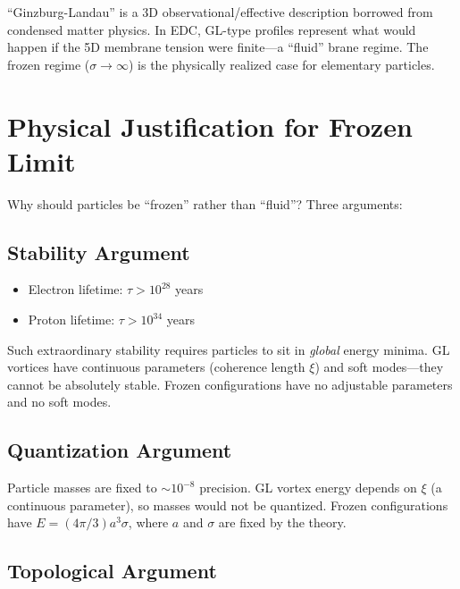 \begin{tcolorbox}[colback=cyan!5!white, colframe=cyan!50!black,
    title=\textbf{Framework 2.0 Clarification}]
``Ginzburg-Landau'' is a 3D observational/effective description borrowed from condensed
matter physics. In EDC, GL-type profiles represent what would happen if the 5D membrane
tension were finite---a ``fluid'' brane regime. The frozen regime ($\sigma \to \infty$)
is the physically realized case for elementary particles.
\end{tcolorbox}


\section{Physical Justification for Frozen Limit}
\label{sec:ch2_frozen_justification}

Why should particles be ``frozen'' rather than ``fluid''? Three arguments:

\subsection{Stability Argument}

\begin{itemize}
    \item Electron lifetime: $\tau > 10^{28}$ years
    \item Proton lifetime: $\tau > 10^{34}$ years
\end{itemize}

Such extraordinary stability requires particles to sit in \emph{global} energy minima.
GL vortices have continuous parameters (coherence length $\xi$) and soft modes---they
cannot be absolutely stable. Frozen configurations have no adjustable parameters and
no soft modes.

\subsection{Quantization Argument}

Particle masses are fixed to $\sim 10^{-8}$ precision. GL vortex energy depends on $\xi$
(a continuous parameter), so masses would not be quantized. Frozen configurations have
$E = (4\pi/3) a^3 \sigma$, where $a$ and $\sigma$ are fixed by the theory.

\subsection{Topological Argument}


